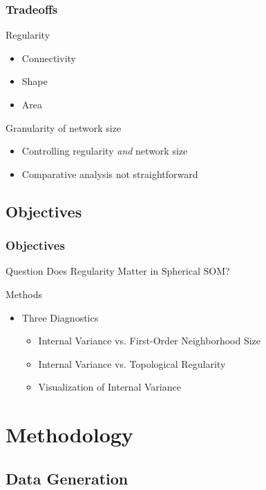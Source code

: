 \documentclass[nototal,handout]{beamer}
\begin{document}
\begin{frame}
	\frametitle{Tradeoffs}
 
\begin{block}{Regularity}
 \begin{itemize}
 \item  Connectivity
 \item  Shape
 \item  Area
 \end{itemize}
 \end{block} 
\begin{block}{Granularity of network size}
 \begin{itemize}
 \item  Controlling regularity \emph{and} network size
 \item  Comparative analysis not straightforward
 \end{itemize}
 \end{block} \end{frame} 

\subsection{Objectives} 

\begin{frame}
	\frametitle{Objectives}
 
\begin{block}{Question}
  Does Regularity Matter in Spherical SOM?
 \end{block} 
\begin{block}{Methods}
 \begin{itemize}
 \item  Three Diagnostics
 \begin{itemize}
 \item  Internal Variance vs. First-Order Neighborhood Size
 \item  Internal Variance vs. Topological Regularity
 \item  Visualization of Internal Variance
 \end{itemize}
 \end{itemize}
 \end{block} \end{frame} 


\section{Methodology} 

\subsection{Data Generation} 
\end{document}
